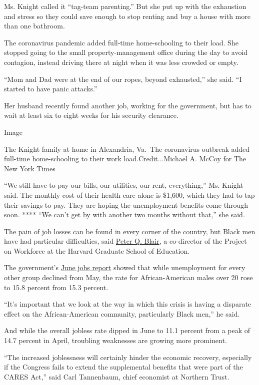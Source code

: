 Ms. Knight called it ``tag-team parenting.'' But she put up with the
exhaustion and stress so they could save enough to stop renting and buy
a house with more than one bathroom.

The coronavirus pandemic added full-time home-schooling to their load.
She stopped going to the small property-management office during the day
to avoid contagion, instead driving there at night when it was less
crowded or empty.

``Mom and Dad were at the end of our ropes, beyond exhausted,'' she
said. ``I started to have panic attacks.''

Her husband recently found another job, working for the government, but
has to wait at least six to eight weeks for his security clearance.

Image

The Knight family at home in Alexandria, Va.~The coronavirus outbreak
added full-time home-schooling to their work load.Credit...Michael A.
McCoy for The New York Times

``We still have to pay our bills, our utilities, our rent, everything,''
Ms. Knight said. The monthly cost of their health care alone is \$1,600,
which they had to tap their savings to pay. They are hoping the
unemployment benefits come through soon. **** ``We can't get by with
another two months without that,'' she said.

The pain of job losses can be found in every corner of the country, but
Black men have had particular difficulties, said
\href{https://www.gse.harvard.edu/faculty/peter-blair}{Peter Q. Blair},
a co-director of the Project on Workforce at the Harvard Graduate School
of Education.

The government's
\href{https://www.bls.gov/news.release/empsit.t02.htm}{June jobs report}
showed that while unemployment for every other group declined from May,
the rate for African-American males over 20 rose to 15.8 percent from
15.3 percent.

``It's important that we look at the way in which this crisis is having
a disparate effect on the African-American community, particularly Black
men,'' he said.

And while the overall jobless rate dipped in June to 11.1 percent from a
peak of 14.7 percent in April, troubling weaknesses are growing more
prominent.

``The increased joblessness will certainly hinder the economic recovery,
especially if the Congress fails to extend the supplemental benefits
that were part of the CARES Act,'' said Carl Tannenbaum, chief economist
at Northern Trust.

